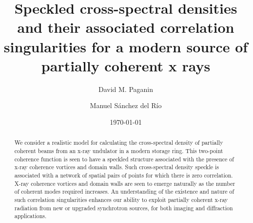 \documentclass[%
 reprint,
 amsmath,amssymb,
 aps,
]{revtex4-1}
\begin{document}

\title{Speckled cross-spectral densities and their associated correlation singularities for a modern source of partially coherent x rays}


\author{David M. Paganin}

\author{Manuel S\'{a}nchez del R\'{i}o}

\date{\today}

\begin{abstract}
We consider a realistic model for calculating the cross-spectral density of partially coherent beams from an x-ray undulator in a modern storage ring.  This two-point coherence function is seen to have a speckled structure associated with the presence of x-ray coherence vortices and domain walls.  Such cross-spectral density speckle is associated with a network of spatial pairs of points for which there is zero correlation.  X-ray coherence vortices and domain walls are seen to emerge naturally as the number of coherent modes required increases.  An understanding of the existence and nature of such correlation singularities enhances our ability to exploit partially coherent x-ray radiation from new or upgraded synchrotron sources, for both imaging and diffraction applications.
\end{abstract}

\maketitle                        %

\end{document}

